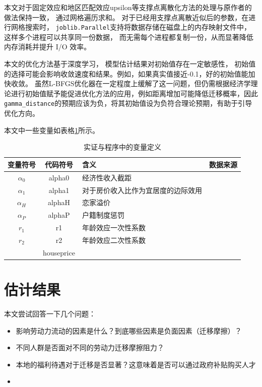 \documentclass[a4paper, zihao=-4, fontset = mac, oneside]{ctexbook} %
\begin{document}
本文对于固定效应和地区匹配效应upsilon等支撑点离散化方法的处理与原作者的做法保持一致，
通过网格遍历求和。
对于已经用支撑点离散近似后的参数，在进行网格搜索时，
\lstinline{joblib.Parallel}支持将数据存储在磁盘上的内存映射文件中，这样多个进程可以共享同一份数据，
而无需每个进程都复制一份，从而显著降低内存消耗并提升 I/O 效率。

本文的优化方法基于深度学习，
模型估计结果对初始值存在一定敏感性，
初始值的选择可能会影响收敛速度和结果。例如，如果真实值接近-0.1，好的初始值能加快收敛。
虽然L-BFGS优化器在一定程度上缓解了这一问题，但仍需根据经济学理论进行初始值赋予能促进优化方法的应用，例如距离增加可能降低迁移概率，因此\lstinline{gamma_distance}的预期应该为负，将其初始值设为负符合理论预期，有助于引导优化方向。


本文中一些变量如表格\ref{tab:_实证与程序中的变量定义}所示。

\begin{table}
\centering
\caption{实证与程序中的变量定义}
\begin{tabularx}{\textwidth}{@{}ccXX@{}}
\toprule
变量符号 & 代码符号 & 含义 & 数据来源\\
\midrule
$\alpha_0$ & alpha0 & 经济性收入截距 &\\
$\alpha_1$ & alpha1 & 对于房价收入比作为宜居度的边际效用&\\
$\alpha_H$ & alphaH & 恋家溢价&\\
$\alpha_P$ & alphaP & 户籍制度惩罚&\\
$r_1$ & r1 & 年龄效应一次性系数& \\
$r_2$ & r2 & 年龄效应二次性系数& \\
 & houseprice & &\\
\bottomrule
\end{tabularx}
\label{tab:_实证与程序中的变量定义}
\end{table}

\chapter{估计结果}

本文尝试回答一下几个问题：
\begin{itemize}
  \item 影响劳动力流动的因素是什么？到底哪些因素是负面因素（迁移摩擦）？
  \item 不同人群是否面对不同的劳动力迁移摩擦阻力？
  \item 本地的福利待遇对于迁移是否显著？这意味着是否可以通过政府补贴购买人才
  \item 
\end{itemize}
\end{document}
